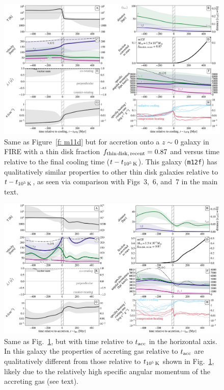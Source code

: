 \documentclass[class=article, crop=false]{standalone}
\newcommand{\fthin}{f_{\rm thin\,disk,\,recent}}
\newcommand{\tcools}{t_{10^5\,{\rm K}}}
\newcommand{\tacc}{t_{\rm acc}}
\begin{document}
\begin{figure}\includegraphics[width=\textwidth]{figures/before_and_after/before_and_after_allone_m12f_md.pdf}
\caption{
Same as Figure~\ref{f: m11d} but for accretion onto a $z\sim0$ galaxy in FIRE with a thin disk fraction $\fthin=0.87$ and versus time relative to the final cooling time ($t - \tcools$).
This galaxy (\texttt{m12f}) has qualitatively similar properties to other thin disk galaxies relative to $t-\tcools$, as seen via comparison with Figs~3,~6, and~7 in the main text.
}
\label{f: m12f-tcools}
\end{figure}

\begin{figure}\includegraphics[width=\textwidth]{figures/variations/relative_to_accretion/before_and_after/before_and_after_allone_m12f_md.pdf}
\caption{
Same as Fig.~\ref{f: m12f-tcools}, but with time relative to $\tacc$ in the horizontal axis. 
In this galaxy the properties of accreting gas relative to $\tacc$ are qualitatively different from those relative to $\tcools$ shown in Fig.~\ref{f: m12f-tcools}, likely due to the relatively high specific angular momentum of the accreting gas (see text). 
}
\label{f: m12f-tacc}
\end{figure}
\end{document}

